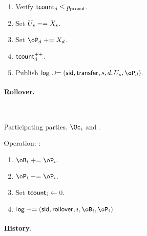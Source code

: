 \begin{protocol}
\begin{enumerate}
\begin{enumerate}
		\item Verify $\mathsf{tcount}_d \le p_{\mathsf{pcount}}$.
		
		
		     \item  Set $U_s \mathrel{-}= X_s$. 
              
              \item  Set $\oP_d \pluseq X_d$. 
              
              \item $\mathsf{tcount}_d^{++}$.
              
		     \item Publish  $\historylog \unioneq (\sid,\transfer,s,d,U_s,\oP_d)$.
		     
		\end{enumerate}
		
	\end{enumerate}
	
\end{protocol}



\paragraph{Rollover.}

\begin{protocol}~\label{prot:ConfidentialTransactions:Rollover}
	\item[Participating parties.] $\Uc_i$ and \Cc.
	
\item[Operation:] \Cc:
	
	\begin{enumerate}
	
	\item $\oB_i  \pluseq \oP_i$.
	
	
	\item  $\oP_i \minuseq \oP_i$.
	
	\item Set $\mathsf{tcount}_i \leftarrow 0$.
	
	
	\item  $\historylog \pluseq (\sid,\rollover,i,\oB_i,\oP_i)$
	
	
\end{enumerate}
	
\end{protocol}


\paragraph{History.}

